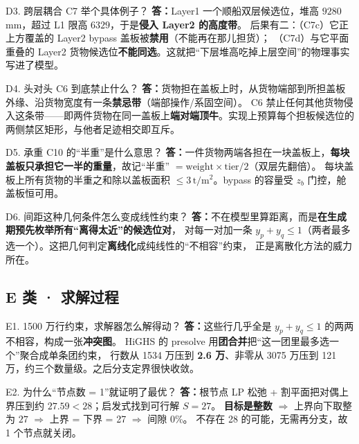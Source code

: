 \documentclass[11pt]{ctexart}
\newcommand{\unit}[1]{\,\mathrm{#1}}
\newcommand{\A}{\textbf{答：}}
\begin{document}
\begin{qa}{D3. 跨层耦合 C7 举个具体例子？}
\A Layer1 一个顺船双层候选位，堆高 $9280$ mm，超过 L1 限高 $6329$，于是\textbf{侵入 Layer2 的高度带}。
后果有二：（C7c）它正上方覆盖的 Layer2 bypass 盖板被\textbf{禁用}（不能再在那儿担货）；
（C7d）与它平面重叠的 Layer2 货物候选位\textbf{不能同选}。这就把“下层堆高吃掉上层空间”的物理事实写进了模型。
\end{qa}

\begin{qa}{D4. 头对头 C6 到底禁止什么？}
\A 货物担在盖板上时，从货物端部到所担盖板外缘、沿货物宽度有一条\textbf{禁忌带}（端部操作/系固空间）。
C6 禁止任何其他货物侵入这条带——即两件货物在同一盖板上\textbf{端对端顶牛}。实现上预算每个担板候选位的两侧禁区矩形，与他者足迹相交即互斥。
\end{qa}

\begin{qa}{D5. 承重 C10 的“半重”是什么意思？}
\A 一件货物两端各担在一块盖板上，\textbf{每块盖板只承担它一半的重量}，故记“半重” $=\text{weight}\times\text{tier}/2$（双层先翻倍）。
每块盖板上所有货物的半重之和除以盖板面积 $\le 3\unit{t/m^2}$。bypass 的容量受 $z_b$ 门控，舱盖板恒可用。
\end{qa}

\begin{qa}{D6. 间距这种几何条件怎么变成线性约束？}
\A 不在模型里算距离，而是\textbf{在生成期预先枚举所有“离得太近”的候选位对}，
对每一对加一条 $y_{p}+y_{q}\le1$（两者最多选一个）。这把几何判定\textbf{离线化}成纯线性的“不相容”约束，
正是离散化方法的威力所在。
\end{qa}

\subsection{E 类 · 求解过程}

\begin{qa}{E1. 1500 万行约束，求解器怎么解得动？}
\A 这些行几乎全是 $y_p+y_q\le1$ 的两两不相容，构成一张\textbf{冲突图}。
HiGHS 的 presolve 用\textbf{团合并}把“这一团里最多选一个”聚合成单条团约束，
行数从 1534 万压到 \textbf{2.6 万}、非零从 3075 万压到 121 万，约三个数量级。之后分支定界很快收敛。
\end{qa}

\begin{qa}{E2. 为什么“节点数 = 1”就证明了最优？}
\A 根节点 LP 松弛 + 割平面把对偶上界压到约 $27.59<28$；启发式找到可行解 $S=27$。
\textbf{目标是整数} $\Rightarrow$ 上界向下取整为 $27$ $\Rightarrow$ 上界 = 下界 = 27 $\Rightarrow$ 间隙 0\%。
不存在 28 的可能，无需再分支，故 1 个节点就关闭。
\end{qa}
\end{document}
